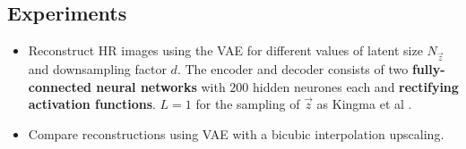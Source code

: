 
\subsection{Experiments}
\label{sub:experiments}

\begin{itemize}
	\item Reconstruct HR images using the VAE for different values of latent size $N_{\vec{z}}$ and downsampling factor $d$. The encoder and decoder consists of two \textbf{fully-connected neural networks} with $200$ hidden neurones each and \textbf{rectifying activation functions}. $L = 1$ for the sampling of $\vec{z}$ as Kingma et al \cite{Kingma2013}.
	\item Compare reconstructions using VAE with a bicubic interpolation upscaling.
\end{itemize}
